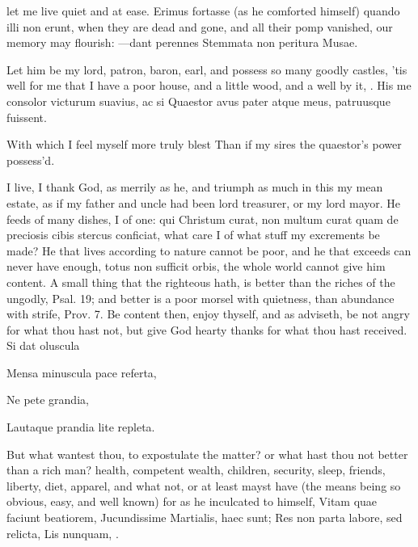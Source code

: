{let me live quiet and at ease. Erimus fortasse (as he comforted
himself) quando illi non erunt, when they are dead and gone, and all
their pomp vanished, our memory may flourish:
---dant perennes
Stemmata non peritura Musae.

Let him be my lord, patron, baron, earl, and possess so many goodly
castles, 'tis well for me that I have a poor house, and a little
wood, and a well by it, \etc{}.
His me consolor victurum suavius, ac si
Quaestor avus pater atque meus, patruusque fuissent.

With which I feel myself more truly blest
Than if my sires the quaestor's power possess'd.

I live, I thank God, as merrily as he, and triumph as much in this my
mean estate, as if my father and uncle had been lord treasurer, or my
lord mayor. He feeds of many dishes, I of one: qui Christum
curat, non multum curat quam de preciosis cibis stercus conficiat, what
care I of what stuff my excrements be made? He that lives
according to nature cannot be poor, and he that exceeds can never have
enough, totus non sufficit orbis, the whole world cannot give him
content. A small thing that the righteous hath, is better than the
riches of the ungodly, Psal.  19; and better is a poor morsel
with quietness, than abundance with strife, Prov.  7. Be content
then, enjoy thyself, and as  \Chrysostom adviseth, be not angry
for what thou hast not, but give God hearty thanks for what thou hast
received.
Si dat oluscula

Mensa minuscula
pace referta,

Ne pete grandia,

Lautaque prandia
lite repleta.

But what wantest thou, to expostulate the matter? or what hast thou not
better than a rich man? health, competent wealth, children,
security, sleep, friends, liberty, diet, apparel, and what not, or at
least mayst have (the means being so obvious, easy, and well known) for
as he inculcated to himself,
Vitam quae faciunt beatiorem,
Jucundissime Martialis, haec sunt;
Res non parta labore, sed relicta,
Lis nunquam, \etc{}.

}
